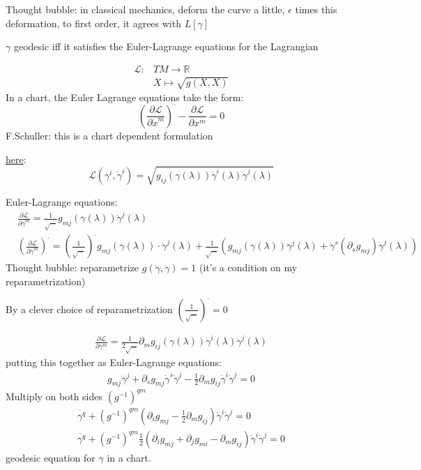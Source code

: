 	Thought bubble: in classical mechanics, deform the curve a little, $\epsilon$ times this deformation, to first order, it agrees with $L[\gamma]$
	
	\begin{theorem}
		$\gamma$ geodesic iff it satisfies the Euler-Lagrange equations for the Lagrangian
	\end{theorem}
	
	\[
	\begin{aligned}
	\mathcal{L}:& TM \to \mathbb{R} \\
	& X \mapsto \sqrt{g(X,X)} \end{aligned}
	\]
	In a chart, the Euler Lagrange equations take the form:
	\[
	\left( \frac{ \partial \mathcal{L}}{  \partial \dot{x}^m } \right)^{\cdot} - \frac{ \partial \mathcal{L}}{ \partial x^m} = 0 
	\]
	F.Schuller: this is a chart dependent formulation
	
	\underline{here}: 
	\[
	\mathcal{L}(\gamma^i , \dot{\gamma}^i ) = \sqrt{ g_{ij}(\gamma(\lambda)) \dot{\gamma}^i(\lambda) \dot{\gamma}^j(\lambda)}
	\]
	
	Euler-Lagrange equations:
	\[
	\begin{aligned}
	& \frac{ \partial \mathcal{L}}{ \partial \dot{\gamma}^m } = \frac{1}{ \sqrt{  \dots } } g_{mj}(\gamma(\lambda)) \dot{\gamma}^j(\lambda) \\ 
	& \left( \frac{ \partial \mathcal{L}}{ \partial \dot{\gamma}^m } \right)^{\cdot} = \left( \frac{1}{ \sqrt{ \dots } } \right)^{\cdot} g_{mj}(\gamma(\lambda)) \cdot \dot{\gamma}^j(\lambda) + \frac{1}{\sqrt{ \dots }} \left( g_{mj}(\gamma(\lambda)) \ddot{\gamma}^j(\lambda) + \dot{\gamma}^s(\partial_s g_{mj}) \dot{\gamma}^j(\lambda) \right)
	\end{aligned}
	\]
	Thought bubble: reparametrize $g(\dot{\gamma}, \dot{\gamma})=1$ (it's a condition on my reparametrization)
	
	By a clever choice of reparametrization $( \frac{1}{\sqrt{ \dots }} )^{\cdot} =0$
	
	\[
	\begin{gathered}
	\frac{ \partial \mathcal{L}}{ \partial \gamma^m} = \frac{1}{ 2\sqrt{ \dots }} \partial_m g_{ij}(\gamma(\lambda)) \dot{\gamma}^i(\lambda) \dot{\gamma}^j(\lambda)
	\end{gathered}
	\]
	putting this together as Euler-Lagrange equations:
	\[
	\begin{gathered}
	g_{mj} \ddot{\gamma}^j +   \partial_s g_{mj} \dot{\gamma}^s \dot{\gamma}^j - \frac{1}{2} \partial_m g_{ij} \dot{\gamma}^i \dot{\gamma}^j = 0 
	\end{gathered}
	\]
	Multiply on both sides $(g^{-1})^{qm}$
	\[
	\begin{gathered}
	\ddot{\gamma^q} + (g^{-1})^{qm}(\partial_i g_{mj} - \frac{1}{2} \partial_m g_{ij} ) \dot{\gamma}^i \dot{\gamma}^j = 0  \\ 
	\boxed{ \ddot{\gamma^q} + (g^{-1})^{qm}\frac{1}{2} (\partial_i g_{mj} + \partial_j g_{mi} -  \partial_m g_{ij} ) \dot{\gamma}^i \dot{\gamma}^j = 0 }
	\end{gathered}
	\]
	geodesic equation for $\gamma$ in a chart.  
	
